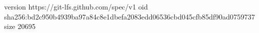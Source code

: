 version https://git-lfs.github.com/spec/v1
oid sha256:bd2c950b4939ba97a84c8e1dbefa2083edd06536cbd045cfb85df90ad0759737
size 20695

